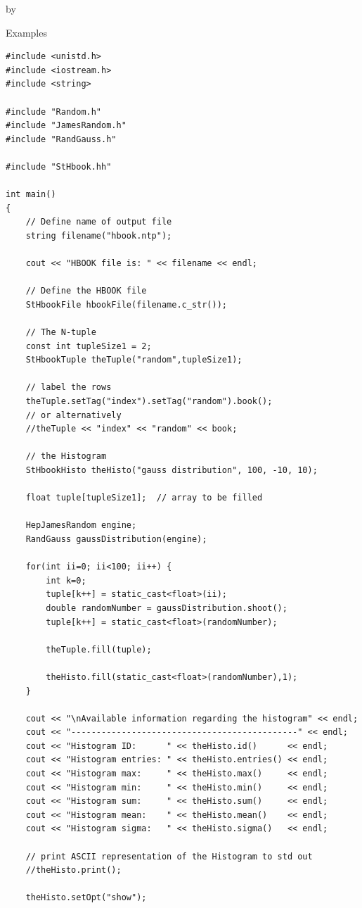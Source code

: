 \documentclass[twoside]{article}
\newcommand{\entrylabel}[1]{\mbox{\textbf{{#1}}}\hfil}%
\newenvironment{entry}
{\begin{list}{}%
    {\renewcommand{\makelabel}{\entrylabel}%
     \setlength{\labelwidth}{90pt}%
     \setlength{\leftmargin}{\labelwidth}
     \advance\leftmargin by \labelsep%
      }%
    }%
  {\end{list}}
\newcommand{\Entrylabel}[1]%
{\raisebox{0pt}[1ex][0pt]{\makebox[\labelwidth][l]%
    {\parbox[t]{\labelwidth}{\hspace{0pt}\textbf{{#1}}}}}}
\newenvironment{Entry}%
{\renewcommand{\entrylabel}{\Entrylabel}\begin{entry}}%
  {\end{entry}}
\begin{document}
\begin{Entry}
\item[Examples]
{\footnotesize
\begin{verbatim}
#include <unistd.h>
#include <iostream.h>
#include <string>

#include "Random.h"
#include "JamesRandom.h"
#include "RandGauss.h"

#include "StHbook.hh"

int main()
{
    // Define name of output file
    string filename("hbook.ntp");

    cout << "HBOOK file is: " << filename << endl;

    // Define the HBOOK file
    StHbookFile hbookFile(filename.c_str());

    // The N-tuple
    const int tupleSize1 = 2;
    StHbookTuple theTuple("random",tupleSize1);

    // label the rows
    theTuple.setTag("index").setTag("random").book();
    // or alternatively
    //theTuple << "index" << "random" << book;

    // the Histogram
    StHbookHisto theHisto("gauss distribution", 100, -10, 10);

    float tuple[tupleSize1];  // array to be filled
    
    HepJamesRandom engine;
    RandGauss gaussDistribution(engine);
    
    for(int ii=0; ii<100; ii++) {
        int k=0;
        tuple[k++] = static_cast<float>(ii);
        double randomNumber = gaussDistribution.shoot();
        tuple[k++] = static_cast<float>(randomNumber);
        
        theTuple.fill(tuple);

        theHisto.fill(static_cast<float>(randomNumber),1);
    }

    cout << "\nAvailable information regarding the histogram" << endl;
    cout << "---------------------------------------------" << endl;
    cout << "Histogram ID:      " << theHisto.id()      << endl;
    cout << "Histogram entries: " << theHisto.entries() << endl;
    cout << "Histogram max:     " << theHisto.max()     << endl;
    cout << "Histogram min:     " << theHisto.min()     << endl;
    cout << "Histogram sum:     " << theHisto.sum()     << endl;
    cout << "Histogram mean:    " << theHisto.mean()    << endl;
    cout << "Histogram sigma:   " << theHisto.sigma()   << endl;

    // print ASCII representation of the Histogram to std out
    //theHisto.print();

    theHisto.setOpt("show");


\end{verbatim}}
\end{Entry}
\end{document}
